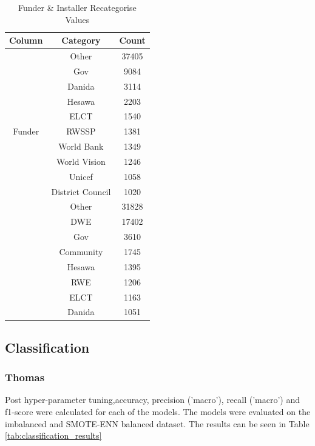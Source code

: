 \documentclass[conference]{IEEEtran}
\begin{document}
\begin{table}[]
  \centering
  \caption{Funder \& Installer Recategorise Values}
  \label{tab:funder_installer_recategorise}
  \begin{tabular}{|c|c|c|}
    \hline
    Column & Category & Count \\
    \hline
    \multirow{11}{*}{Funder} & Other & 37405 \\
    & Gov & 9084 \\
    & Danida & 3114 \\
    & Hesawa & 2203 \\
    & ELCT & 1540 \\
    & RWSSP & 1381 \\
    & World Bank & 1349 \\
    & World Vision & 1246 \\
    & Unicef & 1058 \\
    & District Council & 1020\\
    \hline
    \multirow{9}{*}{Installer} & Other & 31828 \\
    & DWE & 17402 \\
    & Gov & 3610 \\
    & Community & 1745 \\
    & Hesawa & 1395 \\
    & RWE & 1206 \\
    & ELCT & 1163 \\
    & Danida & 1051 \\
    \hline
  \end{tabular}
\end{table}

\subsection{Classification} \label{ref:classification_results}

\subsubsection{Thomas}

Post hyper-parameter tuning,accuracy, precision ('macro'), recall ('macro') and f1-score were calculated for each of the models. The models were evaluated on the imbalanced and SMOTE-ENN balanced dataset. The results can be seen in Table \ref{tab:classification_results}
\end{document}
